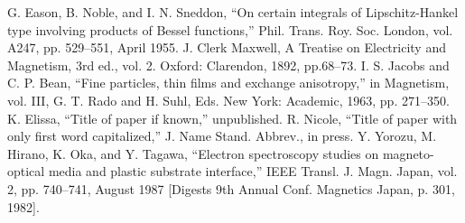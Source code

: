 \documentclass[conference]{IEEEtran}
\begin{document}
\begin{thebibliography}{00}
 G. Eason, B. Noble, and I. N. Sneddon, ``On certain integrals of Lipschitz-Hankel type involving products of Bessel functions,'' Phil. Trans. Roy. Soc. London, vol. A247, pp. 529--551, April 1955.
 J. Clerk Maxwell, A Treatise on Electricity and Magnetism, 3rd ed., vol. 2. Oxford: Clarendon, 1892, pp.68--73.
 I. S. Jacobs and C. P. Bean, ``Fine particles, thin films and exchange anisotropy,'' in Magnetism, vol. III, G. T. Rado and H. Suhl, Eds. New York: Academic, 1963, pp. 271--350.
 K. Elissa, ``Title of paper if known,'' unpublished.
 R. Nicole, ``Title of paper with only first word capitalized,'' J. Name Stand. Abbrev., in press.
 Y. Yorozu, M. Hirano, K. Oka, and Y. Tagawa, ``Electron spectroscopy studies on magneto-optical media and plastic substrate interface,'' IEEE Transl. J. Magn. Japan, vol. 2, pp. 740--741, August 1987 [Digests 9th Annual Conf. Magnetics Japan, p. 301, 1982].
\end{thebibliography}
\end{document}
